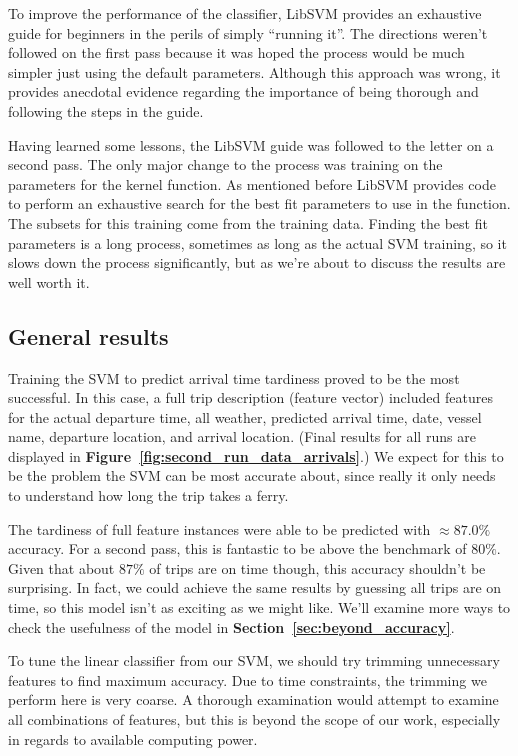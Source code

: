 \documentclass[11pt]{article} %
\begin{document}
To 
improve the performance of the classifier, LibSVM provides an exhaustive guide 
\cite{chang2011libsvm} for beginners in the perils of simply ``running it''. The 
directions weren't followed on the first pass because it was hoped the process 
would be much simpler just using the default parameters. Although this approach
was wrong, it provides anecdotal evidence regarding the importance of being 
thorough and following the steps in the guide.

Having learned some lessons, the LibSVM guide was followed to the letter on a 
second pass. The only major change to the process was training on the 
parameters for the kernel function. As mentioned before LibSVM provides code
to perform an exhaustive search for the best fit parameters to use in the function.
The subsets for this training come from the training data. Finding the best fit 
parameters is a long process, sometimes as long as the actual SVM training, so it
slows down the process significantly, but as we're about to discuss the results
are well worth it.

\subsection{General results}
\label{sec:gen_results}
Training the SVM to predict arrival time tardiness proved to be the most successful.
In this case, a full trip description (feature vector) included features for the 
actual departure 
time, all weather, predicted arrival time, date, vessel name, departure location, 
and arrival location. (Final results for all runs are displayed in 
\textbf{Figure~\ref{fig:second_run_data_arrivals}}.) We expect for this to 
be the problem the SVM can be most accurate about, since really it only needs to 
understand how long the trip takes a ferry. 

The tardiness of full feature instances were able to be predicted with 
$\approx 87.0\%$ accuracy. For a second pass, this is fantastic to be above the
benchmark of $80\%$. Given that about $87\%$ of trips are on time though, this 
accuracy shouldn't be surprising. In fact, we could achieve the same results 
by guessing all trips are on time, so this model isn't as exciting as we might
like. We'll examine more ways to check the usefulness of the model in 
\textbf{Section~\ref{sec:beyond_accuracy}}. 

To tune the linear classifier from our SVM, we should
try trimming unnecessary features to find maximum accuracy. Due to time 
constraints, the trimming we perform here is very coarse. A thorough examination
would attempt to examine all combinations of features, but this is beyond the
scope of our work, especially in regards to available computing power.
\end{document}
